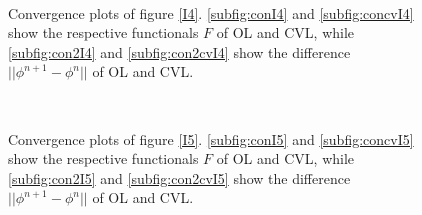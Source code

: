 \begin{figure}[h]
  \centering
  ~
  ~
  ~
  \caption{Convergence plots of figure \ref{I4}. \ref{subfig:conI4} and \ref{subfig:concvI4} show the respective functionals $F$ of OL and CVL, while \ref{subfig:con2I4} and \ref{subfig:con2cvI4} show the difference $||\phi^{n+1}-\phi^n||$ of OL and CVL.}\label{I4con}
\end{figure}

\begin{figure}[h]
  \centering
  ~
  ~
  ~
  \caption{Convergence plots of figure \ref{I5}. \ref{subfig:conI5} and \ref{subfig:concvI5} show the respective functionals $F$ of OL and CVL, while \ref{subfig:con2I5} and \ref{subfig:con2cvI5} show the difference $||\phi^{n+1}-\phi^n||$ of OL and CVL.}\label{I5con}
\end{figure}